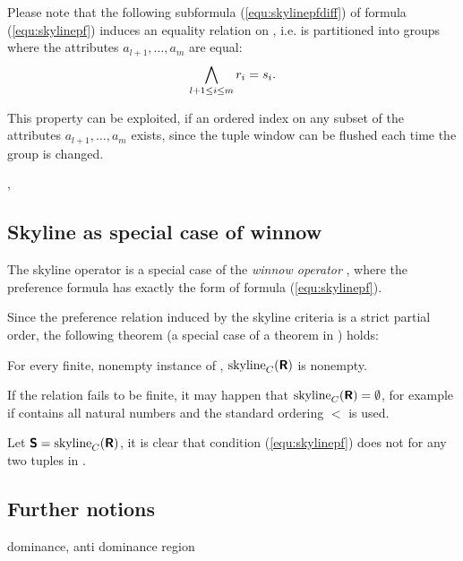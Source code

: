 Please note that the following subformula (\ref{equ:skylinepfdiff}) of formula (\ref{equ:skylinepf}) induces an equality relation on , i.e.  is partitioned into groups where the attributes $a_{l+1}, \ldots, a_m$ are equal:
\begin{equation}\label{equ:skylinepfdiff}
\bigwedge_{l+1 \le i \le m} r_i = s_i.
\end{equation}


This property can be exploited, if an ordered index on any subset of the attributes $a_{l+1}, \ldots, a_m$ exists, since the tuple window can be flushed each time the group is changed.

, 

\subsection{Skyline as special case of winnow}
The skyline operator is a special case of the \emph{winnow operator} \citep{Chomicki2002}, where the preference formula has exactly the form of formula (\ref{equ:skylinepf}).

Since the preference relation induced by the skyline criteria is a strict partial order, the following theorem (a special case of a theorem in \citep{Chomicki2002}) holds:

\begin{theorem}\label{theorem:nonempty}
For every finite, nonempty instance  of , $\skyline_C(\relation{R})$ is nonempty.
\end{theorem}
If the relation  fails to be finite, it may happen that $\skyline_C(\relation{R}) = \emptyset$, for example if  contains all natural numbers and the standard ordering $<$ is used.


\begin{lemma}
Let $\relation{S} = \skyline_C(\relation{R})$, it is clear that condition (\ref{equ:skylinepf}) does not for any two tuples in .
\end{lemma}


\subsection{Further notions}
dominance, anti dominance region

